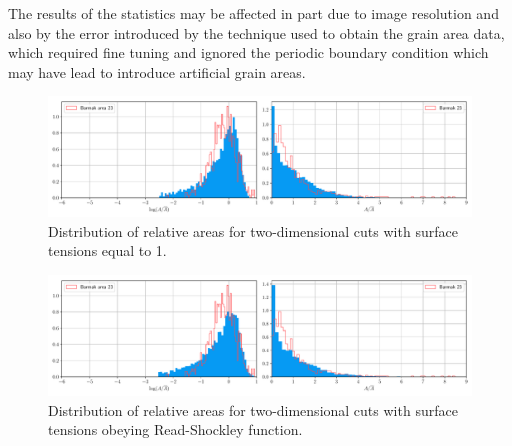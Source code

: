 The results of the statistics may be affected in part due to image resolution and also by the error introduced by the technique used to obtain the grain area data, which required fine tuning and ignored the periodic boundary condition which may have lead to introduce artificial grain areas.

\begin{figure}[t]
    \centering
    \includegraphics[scale=0.41]{figures/esedoglu/areas_equal.pdf}
    \caption{Distribution of relative areas for two-dimensional cuts with surface tensions equal to 1.}
    \label{fig:esedoglu_grains_1}
\end{figure}

\begin{figure}[t]
    \centering
    \includegraphics[scale=0.41]{figures/esedoglu/areas_rs.pdf}
    \caption{Distribution of relative areas for two-dimensional cuts with surface tensions obeying Read-Shockley function.}
    \label{fig:esedoglu_grains_2}
\end{figure}
